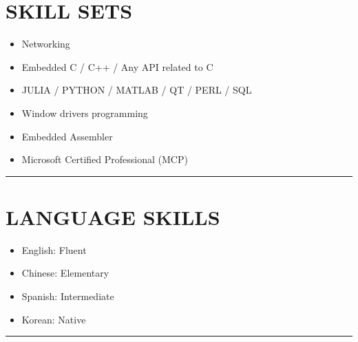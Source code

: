\documentclass[12pt,a4paper]{article}
\begin{document}
\section{SKILL SETS}
\begin{itemize}
\item Networking


\item Embedded C / C++ / Any API related to C


\item JULIA / PYTHON / MATLAB / QT / PERL / SQL


\item Window drivers programming


\item Embedded Assembler  


\item Microsoft Certified Professional (MCP)

\end{itemize}
\rule{\textwidth}{1pt}
\section{LANGUAGE SKILLS}
\begin{itemize}
\item English: Fluent


\item Chinese: Elementary


\item Spanish: Intermediate


\item Korean: Native

\end{itemize}
\rule{\textwidth}{1pt}
\end{document}
